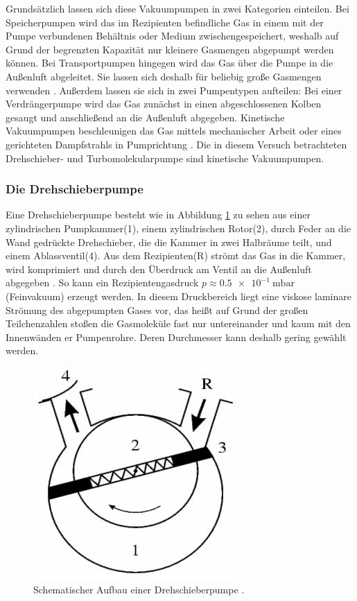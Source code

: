 Grundsätzlich lassen sich diese Vakuumpumpen in zwei Kategorien einteilen.
Bei Speicherpumpen wird das im Rezipienten befindliche Gas in einem mit der Pumpe verbundenen Behältnis oder Medium zwischengespeichert, weshalb auf Grund der begrenzten Kapazität nur kleinere Gasmengen abgepumpt werden können.
Bei Transportpumpen hingegen wird das Gas über die Pumpe in die Außenluft abgeleitet. Sie lassen sich deshalb für beliebig große Gasmengen verwenden \cite{Jena}.\newline
Außerdem lassen sie sich in zwei Pumpentypen aufteilen:\newline
Bei einer Verdrängerpumpe wird das Gas zunächst in einen abgeschlossenen Kolben gesaugt und anschließend an die Außenluft abgegeben.\newline
Kinetische Vakuumpumpen beschleunigen das Gas mittels mechanischer Arbeit oder eines gerichteten Dampfstrahls in Pumprichtung \cite{Pfeiffer}.\newline
Die in diesem Versuch betrachteten Drehschieber- und Turbomolekularpumpe sind kinetische Vakuumpumpen.

\subsubsection{Die Drehschieberpumpe}

Eine Drehschieberpumpe besteht wie in Abbildung \ref{fig:DSP} zu sehen aus einer zylindrischen Pumpkammer(1), einem zylindrischen Rotor(2), durch Feder an die Wand gedrückte Drehschieber, die die Kammer in zwei Halbräume teilt, und einem Ablassventil(4). Aus dem Rezipienten(R) strömt das Gas in die Kammer, wird komprimiert und durch den Überdruck am Ventil an die Außenluft abgegeben \cite{Jena}.\newline
So kann ein Rezipientengasdruck $p\approx \SI{0,5e-1}{\milli\bar}$ (Feinvakuum) erzeugt werden.
In diesem Druckbereich liegt eine viskose laminare Strömung des abgepumpten Gases vor, das heißt auf Grund der großen Teilchenzahlen stoßen die Gasmoleküle fast nur untereinander und kaum mit den Innenwänden er Pumpenrohre. Deren Durchmesser kann deshalb gering gewählt werden.
\begin{figure}
\centering
\includegraphics[scale=0.5]{content/images/Drehschieber.jpg}
\caption{Schematischer Aufbau einer Drehschieberpumpe \cite{Jena}.}
\label{fig:DSP}
\end{figure}

